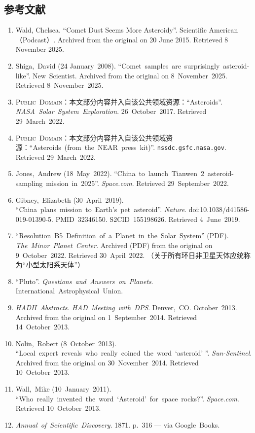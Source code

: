 \subsection{参考文献}
\begin{enumerate}
\item Wald, Chelsea. ``Comet Dust Seems More Asteroidy''. Scientific American（Podcast）. Archived from the original on 20 June 2015. Retrieved 8 November 2025.
\item Shiga,~David (24 January~2008). ``Comet~samples~are~surprisingly~asteroid-like''. New~Scientist. Archived from the original on 8~November~2025. Retrieved 8~November~2025.
\item \textsc{Public~Domain}：本文部分内容并入自该公共领域资源：``Asteroids''. \textit{NASA~Solar~System~Exploration}. 26~October~2017. Retrieved 29~March~2022.
\item \textsc{Public~Domain}：本文部分内容并入自该公共领域资源：``Asteroids~(from~the~NEAR~press~kit)''. \texttt{nssdc.gsfc.nasa.gov}. Retrieved 29~March~2022.
\item Jones,~Andrew (18~May~2022). ``China~to~launch~Tianwen~2~asteroid-sampling~mission~in~2025''. \textit{Space.com}. Retrieved 29~September~2022.
\item Gibney,~Elizabeth (30~April~2019). ``China~plans~mission~to~Earth's~pet~asteroid''. \textit{Nature}. doi:10.1038/d41586-019-01390-5. PMID~32346150. S2CID~155198626. Retrieved 4~June~2019.
\item ``Resolution~B5~Definition~of~a~Planet~in~the~Solar~System'' (PDF). \textit{The~Minor~Planet~Center}. Archived (PDF) from the original on 9~October~2022. Retrieved 30~April~2022. （关于所有环日非卫星天体应统称为“小型太阳系天体”）
\item ``Pluto''. \textit{Questions~and~Answers~on~Planets}. International~Astrophysical~Union.
\item \textit{HADII~Abstracts. HAD~Meeting~with~DPS}. Denver,~CO. October~2013. Archived from the original on 1~September~2014. Retrieved 14~October~2013.
\item Nolin,~Robert (8~October~2013). ``Local~expert~reveals~who~really~coined~the~word~`asteroid' ''. \textit{Sun-Sentinel}. Archived from the original on 30~November~2014. Retrieved 10~October~2013.
\item Wall,~Mike (10~January~2011). ``Who~really~invented~the~word~`Asteroid'~for~space~rocks?''. \textit{Space.com}. Retrieved 10~October~2013.
\item \textit{Annual~of~Scientific~Discovery}. 1871. p.~316 — via Google~Books.

\end{enumerate}

